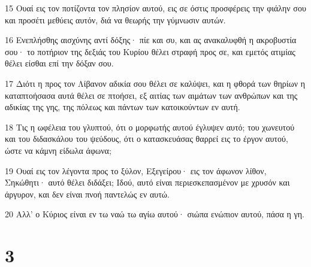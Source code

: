 \par 15 Ουαί εις τον ποτίζοντα τον πλησίον αυτού, εις σε όστις προσφέρεις την φιάλην σου και προσέτι μεθύεις αυτόν, διά να θεωρής την γύμνωσιν αυτών.
\par 16 Ενεπλήσθης αισχύνης αντί δόξης· πίε και συ, και ας ανακαλυφθή η ακροβυστία σου· το ποτήριον της δεξιάς του Κυρίου θέλει στραφή προς σε, και εμετός ατιμίας θέλει είσθαι επί την δόξαν σου.
\par 17 Διότι η προς τον Λίβανον αδικία σου θέλει σε καλύψει, και η φθορά των θηρίων η καταπτοήσασα αυτά θέλει σε πτοήσει, εξ αιτίας των αιμάτων των ανθρώπων και της αδικίας της γης, της πόλεως και πάντων των κατοικούντων εν αυτή.
\par 18 Τις η ωφέλεια του γλυπτού, ότι ο μορφωτής αυτού έγλυψεν αυτό; του χωνευτού και του διδασκάλου του ψεύδους, ότι ο κατασκευάσας θαρρεί εις το έργον αυτού, ώστε να κάμνη είδωλα άφωνα;
\par 19 Ουαί εις τον λέγοντα προς το ξύλον, Εξεγείρου· εις τον άφωνον λίθον, Σηκώθητι· αυτό θέλει διδάξει; Ιδού, αυτό είναι περιεσκεπασμένον με χρυσόν και άργυρον, και δεν είναι πνοή παντελώς εν αυτώ.
\par 20 Αλλ' ο Κύριος είναι εν τω ναώ τω αγίω αυτού· σιώπα ενώπιον αυτού, πάσα η γη.

\chapter{3}

